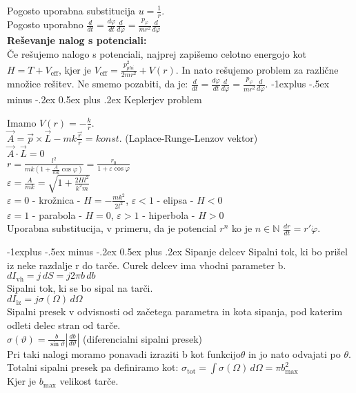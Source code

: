 \documentclass[12pt,landscape]{article}
\makeatletter
\renewcommand{\subsection}{\@startsection{subsection}{2}{0mm}%
                                {-1explus -.5ex minus -.2ex}%
                                {0.5ex plus .2ex}%
                                {\normalfont\normalsize\bfseries}}
\newcommand{\rv}{\vec{r}}
\makeatother
\begin{document}
\begin{multicols}{3}
Pogosto uporabna substitucija $u = \frac{1}{r}$. \\
Pogosto uporabno $\frac{d}{dt} = \frac{d \varphi}{dt} \frac{d}{d \varphi} = \frac{p_\varphi}{mr^2} \frac{d}{d\varphi}$ \medskip \\

\textbf{Reševanje nalog s potenciali:}\\
Če rešujemo nalogo s potenciali, najprej zapišemo celotno energojo kot $H=T+V_{\mathrm{eff}}$, kjer je $V_\mathrm{eff}=\frac{p_{phi}^2}{2mr^2}+V(r)$. In nato rešujemo problem za različne množice rešitev. Ne smemo pozabiti, da je: $\frac{d}{dt} = \frac{d \varphi}{dt} \frac{d}{d \varphi} = \frac{p_\varphi}{mr^2} \frac{d}{d\varphi}$. 
\subsection{Keplerjev problem}

Imamo $V(r) = -\frac{k}{r}$. \\
$\vec A = \vec p \times \vec L - mk \frac{\rv}{r} = konst.$ (Laplace-Runge-Lenzov vektor) \\
$\vec A \cdot \vec L = 0$ \\
$r = \frac{l^2}{mk\left(1 + \frac{A}{mk} \cos \varphi\right)} = \frac{r_0}{1 + \varepsilon \cos \varphi}$ \\
$\varepsilon = \frac{A}{mk} = \sqrt{1 + \frac{2H l^2}{k^2 m}}$\medskip \\

$\varepsilon = 0$ - krožnica - $H = - \frac{mk^2}{2l^2}$, \qquad $\varepsilon < 1$ - elipsa - $H < 0$ \\
$\varepsilon = 1$ - parabola - $H = 0$, \qquad  \qquad $\varepsilon > 1$ - hiperbola - $H > 0$ \medskip \\

Uporabna substitucija, v primeru, da je potencial $r^{n}$ ko je $n \in \mathbb{N}$ \quad $\frac{dr}{dt}=r'\dot{\varphi}$.

\subsection{Sipanje delcev}
Sipalni tok, ki bo prišel iz neke razdalje r do tarče. Curek delcev ima vhodni parameter b.\\
$dI_\mathrm{vh} = j \, dS = j 2\pi b \, db$ \\
Sipalni tok, ki se bo sipal na tarči. \\
$dI_\mathrm{iz} = j \sigma(\Omega) \, d \Omega$ \\
Sipalni presek v odvisnosti od začetega parametra in kota sipanja, pod katerim odleti delec stran od tarče. \\
$\sigma(\vartheta) = \frac{b}{\sin \vartheta} |\frac{db}{d \vartheta}|$ \qquad (diferencialni sipalni presek) \\
Pri taki nalogi moramo ponavadi izraziti b kot funkcijo$\theta$ in jo nato odvajati po $\theta$.\\
Totalni sipalni presek pa definiramo kot:
$\sigma_\mathrm{tot} = \int \sigma(\Omega) \, d \Omega = \pi b_\mathrm{max}^2$ \medskip \\
Kjer je $b_{\mathrm{max}}$ velikost tarče.


\end{multicols}
\end{document}
